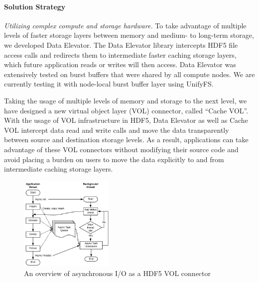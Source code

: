 \paragraph{Solution Strategy}

\textit{Utilizing complex compute and storage hardware. } 
To take advantage of multiple levels of faster storage layers between memory and medium- to long-term storage, we developed Data Elevator. The Data Elevator library intercepts HDF5 file access calls and redirects them to intermediate faster caching storage layers, which future application reads or writes will then access. Data Elevator was extensively tested on burst buffers that were shared by all compute nodes. We are currently testing it with node-local burst buffer layer using UnifyFS. 

Taking the usage of multiple levels of memory and storage to the next level, we have designed a new virtual object layer (VOL) connector, called ``Cache VOL''. With the usage of VOL infrastructure in HDF5, Data Elevator as well as Cache VOL intercept data read and write calls and move the data transparently between source and destination storage levels. As a result, applications can take advantage of these VOL connectors without modifying their source code and avoid placing a burden on users to move the data explicitly to and from intermediate caching storage layers.


\begin{figure}
  \begin{center}
    \includegraphics[width=0.40\textwidth]{async_io_overview.pdf}
  \end{center}
  \caption{An overview of asynchronous I/O as a HDF5 VOL connector}
  \label{fig:asyncio-overview}
\end{figure}

